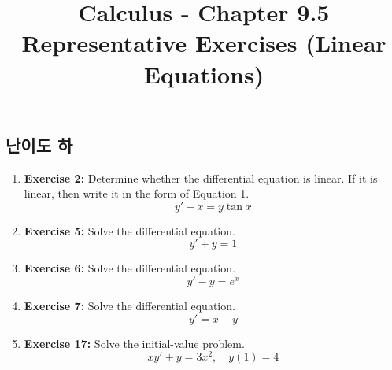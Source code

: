 \documentclass[12pt, a4paper]{article}
\title{Calculus - Chapter 9.5 Representative Exercises (Linear Equations)}
\author{}
\date{}
\begin{document}
\maketitle
\hrulefill
\vspace{1em}

\subsection*{난이도 하}
\begin{enumerate}
    \item \textbf{Exercise 2:} Determine whether the differential equation is linear. If it is linear, then write it in the form of Equation 1.
    \[ y' - x = y \tan x \]

    \item \textbf{Exercise 5:} Solve the differential equation.
    \[ y' + y = 1 \]

    \item \textbf{Exercise 6:} Solve the differential equation.
    \[ y' - y = e^x \]

    \item \textbf{Exercise 7:} Solve the differential equation.
    \[ y' = x - y \]

    \item \textbf{Exercise 17:} Solve the initial-value problem.
    \[ xy' + y = 3x^2, \quad y(1)=4 \]
\end{enumerate}

\hrulefill
\vspace{1em}
\end{document}
